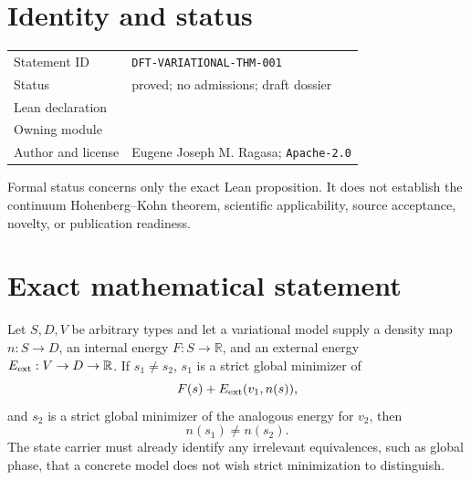 
\section{Identity and status}
\begin{tabularx}{\textwidth}{@{}lY@{}}
\toprule
Statement ID & \texttt{DFT-VARIATIONAL-THM-001} \\
Status & proved; no admissions; draft dossier \\
Lean declaration &  \\
Owning module &  \\
Author and license & Eugene Joseph M. Ragasa; \texttt{Apache-2.0} \\
\bottomrule
\end{tabularx}
Formal status concerns only the exact Lean proposition.  It does not establish the continuum
Hohenberg--Kohn theorem, scientific applicability, source acceptance, novelty, or publication
readiness.

\section{Exact mathematical statement}
Let \(S,D,V\) be arbitrary types and let a variational model supply a density map
\(n:S\to D\), an internal energy \(F:S\to\mathbb R\), and an external energy
\(E_{\rm ext}:V\to D\to\mathbb R\).  If \(s_1\ne s_2\), \(s_1\) is a strict global
minimizer of
\[
  F(s)+E_{\rm ext}(v_1,n(s)),
\]
and \(s_2\) is a strict global minimizer of the analogous energy for \(v_2\), then
\[
  n(s_1)\ne n(s_2).
\]
The state carrier must already identify any irrelevant equivalences, such as global phase, that a
concrete model does not wish strict minimization to distinguish.

